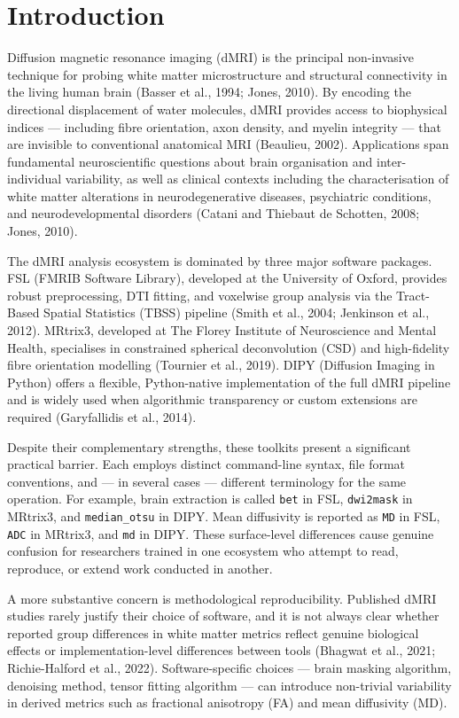 \documentclass[12pt,a4paper]{article}
\begin{document}
\section{Introduction}\label{introduction}

Diffusion magnetic resonance imaging (dMRI) is the principal non-invasive technique for probing white matter microstructure and structural connectivity in the living human brain (Basser et al., 1994; Jones, 2010). By encoding the directional displacement of water molecules, dMRI provides access to biophysical indices --- including fibre orientation, axon density, and myelin integrity --- that are invisible to conventional anatomical MRI (Beaulieu, 2002). Applications span fundamental neuroscientific questions about brain organisation and inter-individual variability, as well as clinical contexts including the characterisation of white matter alterations in neurodegenerative diseases, psychiatric conditions, and neurodevelopmental disorders (Catani and Thiebaut de Schotten, 2008; Jones, 2010).

The dMRI analysis ecosystem is dominated by three major software packages. FSL (FMRIB Software Library), developed at the University of Oxford, provides robust preprocessing, DTI fitting, and voxelwise group analysis via the Tract-Based Spatial Statistics (TBSS) pipeline (Smith et al., 2004; Jenkinson et al., 2012). MRtrix3, developed at The Florey Institute of Neuroscience and Mental Health, specialises in constrained spherical deconvolution (CSD) and high-fidelity fibre orientation modelling (Tournier et al., 2019). DIPY (Diffusion Imaging in Python) offers a flexible, Python-native implementation of the full dMRI pipeline and is widely used when algorithmic transparency or custom extensions are required (Garyfallidis et al., 2014).

Despite their complementary strengths, these toolkits present a significant practical barrier. Each employs distinct command-line syntax, file format conventions, and --- in several cases --- different terminology for the same operation. For example, brain extraction is called \texttt{bet} in FSL, \texttt{dwi2mask} in MRtrix3, and \texttt{median\_otsu} in DIPY. Mean diffusivity is reported as \texttt{MD} in FSL, \texttt{ADC} in MRtrix3, and \texttt{md} in DIPY. These surface-level differences cause genuine confusion for researchers trained in one ecosystem who attempt to read, reproduce, or extend work conducted in another.

A more substantive concern is methodological reproducibility. Published dMRI studies rarely justify their choice of software, and it is not always clear whether reported group differences in white matter metrics reflect genuine biological effects or implementation-level differences between tools (Bhagwat et al., 2021; Richie-Halford et al., 2022). Software-specific choices --- brain masking algorithm, denoising method, tensor fitting algorithm --- can introduce non-trivial variability in derived metrics such as fractional anisotropy (FA) and mean diffusivity (MD).
\end{document}
